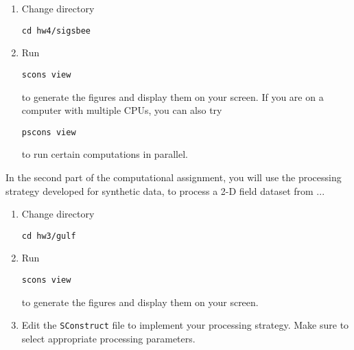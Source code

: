
\begin{enumerate}
\item Change directory 
\begin{verbatim}
cd hw4/sigsbee
\end{verbatim}
\item Run
\begin{verbatim}
scons view
\end{verbatim}
to generate the figures and display them on your screen.
If you are on a computer with multiple CPUs, you
can also try
\begin{verbatim}
pscons view
\end{verbatim}
to run certain computations in parallel.
\end{enumerate}

\lstset{language=python,numbers=left,numberstyle=\tiny,showstringspaces=false}
{\small	}

\lstset{language=c,numbers=left,numberstyle=\tiny,showstringspaces=false}



\item In the second part of the computational assignment, you will use the processing strategy developed for synthetic data, 
to process a 2-D field dataset from ...

\begin{enumerate}
\item Change directory 
\begin{verbatim}
cd hw3/gulf
\end{verbatim}
\item Run
\begin{verbatim}
scons view
\end{verbatim}
to generate the figures and display them on your screen.
\item Edit the \texttt{SConstruct} file to implement your processing strategy. 
Make sure to select appropriate processing parameters.
\end{enumerate}

\lstset{language=python,numbers=left,numberstyle=\tiny,showstringspaces=false}
%

